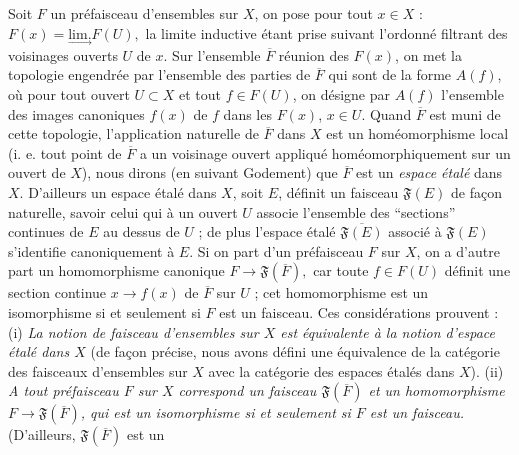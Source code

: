 Soit $F$ un préfaisceau d'ensembles sur $X$, on pose pour tout $x\in X$ :
$F(x)=\underset{\to}{\mathrm{lim.}}F(U),$
la limite inductive étant prise suivant l'ordonné filtrant des voisinages
ouverts $U$ de $x$. Sur l'ensemble $\overline F$ réunion des $F(x)$, on met
la topologie engendrée par l'ensemble des parties de $\overline F$ qui sont de
la forme $A(f)$, où pour tout ouvert $U\subset X$ et tout $f\in F(U)$, on
désigne par $A(f)$ l'ensemble des images canoniques $f(x)$ de $f$ dans les
$F(x)$, $x\in U$. Quand $\overline F$ est muni de cette topologie,
l'application naturelle de $\overline F$ dans $X$ est un homéomorphisme local
(i. e. tout point de $\overline F$ a un voisinage ouvert appliqué
homéomorphiquement sur un ouvert de $X$), nous dirons (en suivant Godement)
que $\overline F$ est un \textit{espace étalé} dans $X$.
D'ailleurs un espace étalé dans $X$, soit $E$, définit un faisceau
$\mathfrak F(E)$ de façon naturelle, savoir celui qui à un ouvert $U$ associe
l'ensemble des ``sections'' continues de $E$ au dessus de $U$ ; de plus
l'espace étalé $\overline{\mathfrak F(E)}$ associé à $\mathfrak F(E)$
s'identifie canoniquement à $E$. Si on part d'un préfaisceau $F$ sur $X$, on
a d'autre part un homomorphisme canonique
$F\to\mathfrak F(\overline F),$
car toute $f\in F(U)$ définit une section continue
$x\to f(x)$ de $\overline F$ sur $U$ ; cet homomorphisme est un
isomorphisme si et seulement si $F$ est un faisceau. Ces considérations
prouvent : (i) \textit{La notion de faisceau d'ensembles sur $X$ est
équivalente à la notion d'espace étalé dans $X$} (de façon précise, nous avons
défini une équivalence de la catégorie des faisceaux d'ensembles sur $X$ avec
la catégorie des espaces étalés dans $X$).
(ii) \textit{A tout préfaisceau $F$ sur $X$ correspond un faisceau
$\mathfrak F(\overline F)$ et un homomorphisme
$F\to\mathfrak F(\overline F)$, qui est un isomorphisme si et
seulement si $F$ est un faisceau.} (D'ailleurs, $\mathfrak F(\overline F)$ est
un


